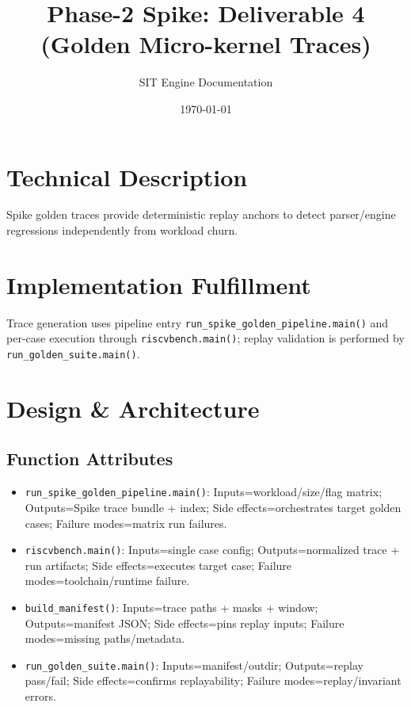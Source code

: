 \documentclass[11pt,a4paper]{article}
\title{Phase-2 Spike: Deliverable 4 (Golden Micro-kernel Traces)}
\author{SIT Engine Documentation}
\date{\today}
\begin{document}
\maketitle

\section{Technical Description}
Spike golden traces provide deterministic replay anchors to detect parser/engine regressions independently from workload churn.

\section{Implementation Fulfillment}
Trace generation uses pipeline entry \texttt{run\_spike\_golden\_pipeline.main()} and per-case execution through \texttt{riscvbench.main()}; replay validation is performed by \texttt{run\_golden\_suite.main()}.

\section{Design \& Architecture}
\subsection*{Function Attributes}
\begin{itemize}[leftmargin=*]
  \item \texttt{run\_spike\_golden\_pipeline.main()}: Inputs=workload/size/flag matrix; Outputs=Spike trace bundle + index; Side effects=orchestrates target golden cases; Failure modes=matrix run failures.
  \item \texttt{riscvbench.main()}: Inputs=single case config; Outputs=normalized trace + run artifacts; Side effects=executes target case; Failure modes=toolchain/runtime failure.
  \item \texttt{build\_manifest()}: Inputs=trace paths + masks + window; Outputs=manifest JSON; Side effects=pins replay inputs; Failure modes=missing paths/metadata.
  \item \texttt{run\_golden\_suite.main()}: Inputs=manifest/outdir; Outputs=replay pass/fail; Side effects=confirms replayability; Failure modes=replay/invariant errors.
\end{itemize}
\end{document}
